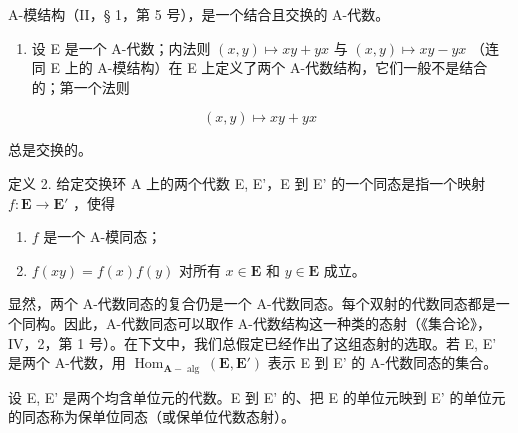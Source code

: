 A-模结构（II，§ 1，第 5 号），是一个结合且交换的 A-代数。

\begin{enumerate}
\def\labelenumi{(\arabic{enumi})}
\setcounter{enumi}{3}
\tightlist
\item
  设 E 是一个 A-代数；内法则 \((x,y)\mapsto xy+yx\) 与 \((x,y)\mapsto xy-yx\) （连同 E 上的 A-模结构）在 E 上定义了两个 A-代数结构，它们一般不是结合的；第一个法则
\end{enumerate}

\[
(x, y) \mapsto x y + y x
\]

总是交换的。

定义 2. 给定交换环 A 上的两个代数 E, E'，E 到 E' 的一个同态是指一个映射 \(f: \mathbf{E} \to \mathbf{E}'\) ，使得

\begin{enumerate}
\def\labelenumi{(\arabic{enumi})}
\item
  \(f\) 是一个 A-模同态；
\item
  \(f(xy) = f(x)f(y)\) 对所有 \(x \in \mathbf{E}\) 和 \(y \in \mathbf{E}\) 成立。
\end{enumerate}

显然，两个 A-代数同态的复合仍是一个 A-代数同态。每个双射的代数同态都是一个同构。因此，A-代数同态可以取作 A-代数结构这一种类的态射（《集合论》，IV，2，第 1 号）。在下文中，我们总假定已经作出了这组态射的选取。若 E, E' 是两个 A-代数，用 \(\operatorname{Hom}_{\mathbf{A}-\operatorname{alg}}(\mathbf{E}, \mathbf{E}')\) 表示 E 到 E' 的 A-代数同态的集合。

设 E, E' 是两个均含单位元的代数。E 到 E' 的、把 E 的单位元映到 E' 的单位元的同态称为保单位同态（或保单位代数态射）。

